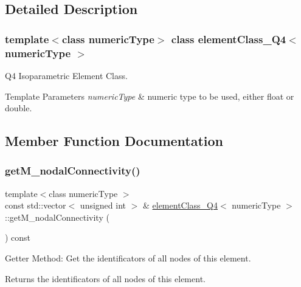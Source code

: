 \subsection{Detailed Description}
\subsubsection*{template$<$class numeric\+Type$>$\newline
class element\+Class\+\_\+\+Q4$<$ numeric\+Type $>$}

Q4 Isoparametric Element Class. 
\begin{DoxyTemplParams}{Template Parameters}
{\em numeric\+Type} & numeric type to be used, either float or double. \\
\hline
\end{DoxyTemplParams}


\subsection{Member Function Documentation}
\mbox{\label{classelement_class___q4_abe3f00cce16a360c1810f50f56fff445}} 
\subsubsection{\texorpdfstring{get\+M\+\_\+nodal\+Connectivity()}{getM\_nodalConnectivity()}}
{\footnotesize\ttfamily template$<$class numeric\+Type $>$ \\
const std\+::vector$<$ unsigned int $>$ \& \mbox{\hyperlink{classelement_class___q4}{element\+Class\+\_\+\+Q4}}$<$ numeric\+Type $>$\+::get\+M\+\_\+nodal\+Connectivity (\begin{DoxyParamCaption}{ }\end{DoxyParamCaption}) const}

Getter Method\+: Get the identificators of all nodes of this element. \begin{DoxyReturn}{Returns}
the identificators of all nodes of this element. 
\end{DoxyReturn}
\mbox{\label{classelement_class___q4_a7503f92c139700e19433c2843496b670}} 
